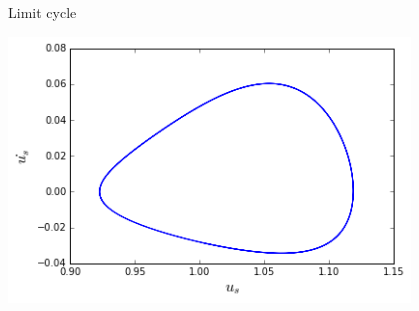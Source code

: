 \documentclass{beamer}
\begin{document}
\begin{frame}{Limit cycle}
	\begin{center}
		\includegraphics[height=200pt]{lim46}\\
		
	\end{center}	
\end{frame}
\end{document}

